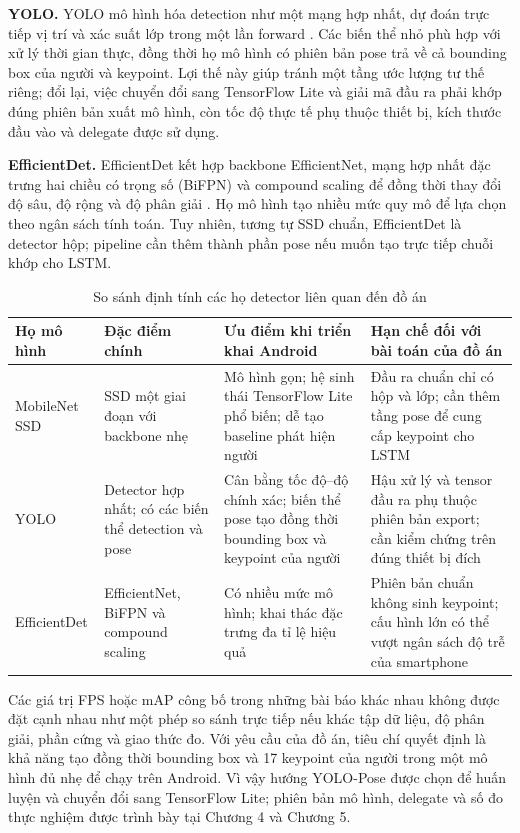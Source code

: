 \textbf{YOLO.} YOLO mô hình hóa detection như một mạng hợp nhất, dự đoán trực tiếp vị trí và xác suất lớp trong một lần forward . Các biến thể nhỏ phù hợp với xử lý thời gian thực, đồng thời họ mô hình có phiên bản pose trả về cả bounding box của người và keypoint. Lợi thế này giúp tránh một tầng ước lượng tư thế riêng; đổi lại, việc chuyển đổi sang TensorFlow Lite và giải mã đầu ra phải khớp đúng phiên bản xuất mô hình, còn tốc độ thực tế phụ thuộc thiết bị, kích thước đầu vào và delegate được sử dụng.

\textbf{EfficientDet.} EfficientDet kết hợp backbone EfficientNet, mạng hợp nhất đặc trưng hai chiều có trọng số (BiFPN) và compound scaling để đồng thời thay đổi độ sâu, độ rộng và độ phân giải . Họ mô hình tạo nhiều mức quy mô để lựa chọn theo ngân sách tính toán. Tuy nhiên, tương tự SSD chuẩn, EfficientDet là detector hộp; pipeline cần thêm thành phần pose nếu muốn tạo trực tiếp chuỗi khớp cho LSTM.

\begin{table}[htbp]
\centering
\caption{So sánh định tính các họ detector liên quan đến đồ án}
\label{tab:mobile_detector_comparison}
\renewcommand{\arraystretch}{1.15}
\begin{tabularx}{\textwidth}{|p{2.5cm}|p{3.2cm}|X|X|}
\hline
\textbf{Họ mô hình} & \textbf{Đặc điểm chính} & \textbf{Ưu điểm khi triển khai Android} & \textbf{Hạn chế đối với bài toán của đồ án} \\
\hline
MobileNet SSD & SSD một giai đoạn với backbone nhẹ & Mô hình gọn; hệ sinh thái TensorFlow Lite phổ biến; dễ tạo baseline phát hiện người & Đầu ra chuẩn chỉ có hộp và lớp; cần thêm tầng pose để cung cấp keypoint cho LSTM \\
\hline
YOLO & Detector hợp nhất; có các biến thể detection và pose & Cân bằng tốc độ--độ chính xác; biến thể pose tạo đồng thời bounding box và keypoint của người & Hậu xử lý và tensor đầu ra phụ thuộc phiên bản export; cần kiểm chứng trên đúng thiết bị đích \\
\hline
EfficientDet & EfficientNet, BiFPN và compound scaling & Có nhiều mức mô hình; khai thác đặc trưng đa tỉ lệ hiệu quả & Phiên bản chuẩn không sinh keypoint; cấu hình lớn có thể vượt ngân sách độ trễ của smartphone \\
\hline
\end{tabularx}
\end{table}

Các giá trị FPS hoặc mAP công bố trong những bài báo khác nhau không được đặt cạnh nhau như một phép so sánh trực tiếp nếu khác tập dữ liệu, độ phân giải, phần cứng và giao thức đo. Với yêu cầu của đồ án, tiêu chí quyết định là khả năng tạo đồng thời bounding box và 17 keypoint của người trong một mô hình đủ nhẹ để chạy trên Android. Vì vậy hướng YOLO-Pose được chọn để huấn luyện và chuyển đổi sang TensorFlow Lite; phiên bản mô hình, delegate và số đo thực nghiệm được trình bày tại Chương 4 và Chương 5.


